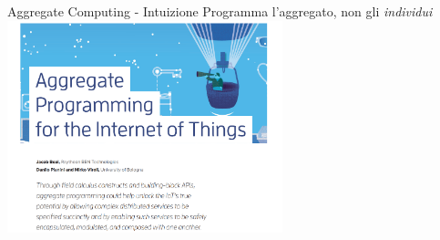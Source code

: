 \documentclass[presentation, 10pt,aspectratio=169]{beamer}\mode<presentation>{\usetheme{AMSBolognaFC}}
\begin{document}
\begin{frame}{Aggregate Computing - Intuizione}
	\centering
	\Large Programma l'\alert{aggregato}, non gli \emph{individui}
	\href{https://ieeexplore.ieee.org/document/7274429}{\includegraphics[width=0.6\textwidth]{img/overview.png}}
\end{frame}
\end{document}
